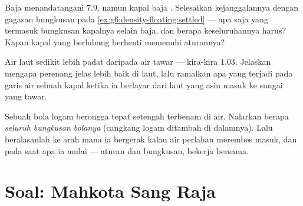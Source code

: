 \begin{exercise}[$\star\star$]\label{exo:g6:density-floating:10}
Baja menandatangani $7.9$, namun kapal baja . Selesaikan
kejanggalannya dengan gagasan bungkusan pada
\cref{ex:g6:density-floating:settled} --- apa saja yang termasuk
bungkusan kapalnya selain baja, dan berapa 
keseluruhannya harus? Kapan kapal yang berlubang berhenti memenuhi
aturannya?
\end{exercise}

\begin{exercise}[$\star\star$]\label{exo:g6:density-floating:11}
Air laut sedikit lebih padat daripada air tawar --- kira-kira $1.03$.
Jelaskan mengapa perenang  jelas lebih baik di laut, lalu
ramalkan apa yang terjadi pada garis air sebuah kapal ketika ia
berlayar dari laut yang asin masuk ke sungai yang tawar.
\end{exercise}

\begin{exercise}[$\star\star\star$]\label{exo:g6:density-floating:12}
Sebuah bola logam berongga  tepat setengah terbenam di air.
Nalarkan berapa  \emph{seluruh bungkusan bolanya}
(cangkang logam ditambah  di dalamnya). Lalu beralasanlah ke arah
mana ia bergerak kalau air perlahan merembes masuk, dan pada saat apa
ia mulai  --- aturan dan bungkusan, bekerja bersama.
\end{exercise}

\section{Soal: Mahkota Sang Raja}

